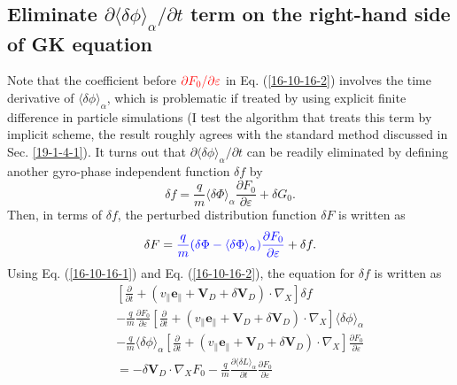 \documentclass{article}
\newcommand{\tmcolor}[2]{{\color{#1}{#2}}}
\begin{document}
\subsection{Eliminate $\partial \langle \delta \phi \rangle_{\alpha} /
\partial t$ term on the right-hand side of GK equation}

Note that the coefficient before $\tmcolor{red}{\partial F_0 / \partial
\varepsilon}$ in Eq. (\ref{16-10-16-2}) involves the time derivative of
$\langle \delta \phi \rangle_{\alpha}$, which is problematic if treated by
using explicit finite difference in particle simulations (I test the algorithm
that treats this term by implicit scheme, the result roughly agrees with the
standard method discussed in Sec. \ref{19-1-4-1}). It turns out that $\partial
\langle \delta \phi \rangle_{\alpha} / \partial t$ can be readily eliminated
by defining another gyro-phase independent function $\delta f$ by
\begin{equation}
  \label{16-10-16-1} \delta f = \frac{q}{m} \langle \delta \Phi
  \rangle_{\alpha} \frac{\partial F_0}{\partial \varepsilon} + \delta G_0 .
\end{equation}
Then, in terms of $\delta f$, the perturbed distribution function $\delta F$
is written as
\begin{equation}
  \label{17-8-19-2} \delta F = \tmcolor{blue}{\frac{q}{m} (\delta \Phi -
  \langle \delta \Phi \rangle_{\alpha}) \frac{\partial F_0}{\partial
  \varepsilon}} + \delta f.
\end{equation}
Using Eq. (\ref{16-10-16-1}) and Eq. (\ref{16-10-16-2}), the equation for
$\delta f$ is written as
\begin{eqnarray}
  &  & \left[ \frac{\partial}{\partial t} + (v_{\parallel}
  \mathbf{e}_{\parallel} +\mathbf{V}_D + \delta \mathbf{V}_D) \cdot \nabla_X
  \right] \delta f \nonumber\\
  &  & - \frac{q}{m}  \frac{\partial F_0}{\partial \varepsilon} \left[
  \frac{\partial}{\partial t} + (v_{\parallel} \mathbf{e}_{\parallel}
  +\mathbf{V}_D + \delta \mathbf{V}_D) \cdot \nabla_X \right] \langle \delta
  \phi \rangle_{\alpha} \nonumber\\
  &  & - \frac{q}{m}  \langle \delta \phi \rangle_{\alpha} \left[
  \frac{\partial}{\partial t} + (v_{\parallel} \mathbf{e}_{\parallel}
  +\mathbf{V}_D + \delta \mathbf{V}_D) \cdot \nabla_X \right] \frac{\partial
  F_0}{\partial \varepsilon} \nonumber\\
  &  & = - \delta \mathbf{V}_D \cdot \nabla_X F_0 - \frac{q}{m} 
  \frac{\partial \langle \delta L \rangle_{\alpha}}{\partial t} 
  \frac{\partial F_0}{\partial \varepsilon} 
\end{eqnarray}
\end{document}
